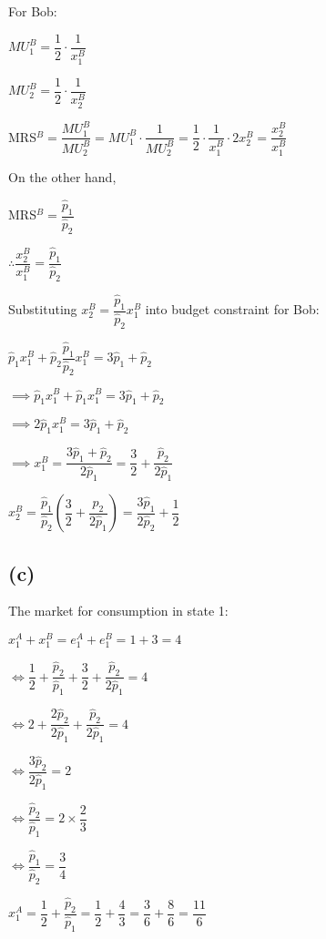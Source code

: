 \documentclass{article}
\begin{document}
For Bob:

$MU^{B}_{1}=\dfrac{1}{2}\cdot\dfrac{1}{x^{B}_{1}}$

$MU^{B}_{2}=\dfrac{1}{2}\cdot\dfrac{1}{x^{B}_{2}}$

MRS$^{B}=\dfrac{MU^{B}_{1}}{MU^{B}_{2}}=MU^{B}_{1}\cdot\dfrac{1}{MU^{B}_{2}}=\dfrac{1}{2}\cdot\dfrac{1}{x^{B}_{1}}\cdot2x^{B}_{2}=\dfrac{x^{B}_{2}}{x^{B}_{1}}$

On the other hand, 

MRS$^{B}=\dfrac{\hat{p}_{1}}{\hat{p}_{2}}$

$\therefore \dfrac{x^{B}_{2}}{x^{B}_{1}}=\dfrac{\hat{p}_{1}}{\hat{p}_{2}}$

Substituting $x^{B}_{2}=\dfrac{\hat{p}_{1}}{\hat{p}_{2}}x^{B}_{1}$ into budget constraint for Bob:

$\hat{p}_{1}x^{B}_{1}+\hat{p}_{2}\dfrac{\hat{p}_{1}}{\hat{p}_{2}}x^{B}_{1}=3\hat{p}_{1}+\hat{p}_{2}$

$\implies \hat{p}_{1}x^{B}_{1}+\hat{p}_{1}x^{B}_{1}=3\hat{p}_{1}+\hat{p}_{2}$

$\implies 2\hat{p}_{1}x^{B}_{1}=3\hat{p}_{1}+\hat{p}_{2}$

$\implies x^{B}_{1}=\dfrac{3\hat{p}_{1}+\hat{p}_{2}}{2\hat{p}_{1}}=\boxed{\dfrac{3}{2}+\dfrac{\hat{p}_{2}}{2\hat{p}_{1}}}$

$x^{B}_{2}=\dfrac{\hat{p}_{1}}{\hat{p}_{2}}\left(\dfrac{3}{2}+\dfrac{\hat{p}_{2}}{2\hat{p}_{1}}\right)=\boxed{\dfrac{3\hat{p}_{1}}{2\hat{p}_{2}}+\dfrac{1}{2}}$

\subsection*{(c)}

The market for consumption in state 1: 

$x^{A}_{1}+x^{B}_{1}=e^{A}_{1}+e^{B}_{1}=1+3=4$

$\iff \dfrac{1}{2}+\dfrac{\hat{p}_{2}}{\hat{p}_{1}}+\dfrac{3}{2}+\dfrac{\hat{p}_{2}}{2\hat{p}_{1}}=4$

$\iff 2+\dfrac{2\hat{p}_{2}}{2\hat{p}_{1}}+\dfrac{\hat{p}_{2}}{2\hat{p}_{1}}=4$

$\iff \dfrac{3\hat{p}_{2}}{2\hat{p}_{1}}=2$

$\iff \dfrac{\hat{p}_{2}}{\hat{p}_{1}}=2\times\dfrac{2}{3}$

$\iff \boxed{\dfrac{\hat{p}_{1}}{\hat{p}_{2}}=\dfrac{3}{4}}$

$x^{A}_{1}=\dfrac{1}{2}+\dfrac{\hat{p}_{2}}{\hat{p}_{1}}=\dfrac{1}{2}+\dfrac{4}{3}=\dfrac{3}{6}+\dfrac{8}{6}=\dfrac{11}{6}$
\end{document}
